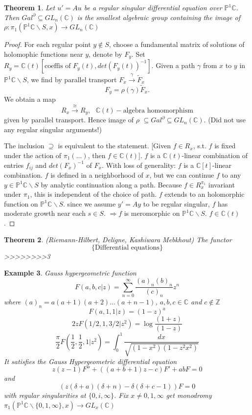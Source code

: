 \documentclass[11pt]{article}
\newtheorem{thm}{Theorem}[section]
\newtheorem{ex}[thm]{Example}
\newcommand{\pd}{\partial}
\newcommand{\cplx}{\mathbb C}
\newcommand{\intg}{\mathbb Z}
\newcommand{\Lrta}{\Longrightarrow}
\newcommand{\lrta}{\longrightarrow}
\begin{document}
\begin{thm}
Let $u'=A u$ be a regular singular differential equation over $\mathbb{P}^1\cplx$. Then $Gal^\pd\subseteq GL_n(\cplx)$ is the smallest algebraic group containing the image of $\rho: \pi_1(\mathbb{P}^1\cplx\backslash S,x)\lrta GL_n(\cplx)$
\end{thm}
\begin{proof}
For each regular point $y\notin S$, choose a fundamental matrix of solutions of holomophic functions near $y$, denote by $F_y$. Set $R_y=\cplx(t)[\text{coeffis of $F_y(t)$}, det(F_y(t))^{-1}]$. Given a path $\gamma$ from $x$ to $y$ in $\mathbb{P}^1\cplx\backslash S$, we find by parallel transport $F_x\overset{\gamma}{\lrta}\tilde{F}_x$
$$
F_y=\rho(\gamma) \tilde{F}_x.
$$
We obtain a map 
$$
R_x\overset{\cong}{\lrta}R_y, \ \ \ \cplx(t)-\text{algebra homomorphism}
$$
given by parallel transport. Hence image of $\rho$ $\subseteq Gal^\pd\subseteq GL_n(\cplx)$. (Did not use any regular singular arguments!)

The inclusion $\supseteq$ is equivalent  to the statement.
[Given $f\in R_x$, s.t. $f$ is fixed under the action of $\pi_1(...)$, then $f\in \cplx(t)$]. $f$ is a $\cplx(t)$-linear combination of entries $f_{ij} $ and $det(F_x)^{-1}$ of $F_x$. With loss of generality: $f$ is a $\cplx[t]$-linear combination. $f$ is defined in a neighborhood of $x$, but we can continue $f$ to any $y\in \mathbb{P}^1\cplx\backslash S$ by analytic continuation along a path. Because $f\in R_x^{\pi_1}$ invariant under $\pi_1$, this is independent of the choice of path. $f$ extends to an holomorphic function on $\mathbb{P}^1\cplx\backslash S$. since we assume $y'=Ay$ to be regular singular, $f$ has moderate growth near each $s\in S$.
$\Lrta f$ is meromorphic on $\mathbb{P}^1\cplx\backslash S$. $f\in \cplx(t)$.
\end{proof}

\begin{thm}
(Riemann-Hilbert, Deligne, Kashiwara Mebkhout)
The functor
$$
\{\text{Differential equations}\}
$$
>>>>>>>>3
\end{thm}


\begin{ex}
Gauss hypergeometric function
$$
F(a,b,c|z)=\sum^\infty_{n=0}\frac{(a)_n (b)_n}{(c)_n}z^n
$$
where $(a)_n=a(a+1)(a+2)...(a+n-1)$, $a,b,c\in\cplx$ and $c\notin \intg$
$$
F(a,1,1|z)=(1-z)^a
$$
$$
2z F(1/2,1,3/2|z^2)=\log\frac{(1+z)}{(1-z)}
$$
$$
\frac{\pi}{2}F(\frac{1}{2},\frac{1}{2},1|z^2)=\int^1_0\frac{dx}{\sqrt{(1-x^2)(1-z^2x^2)}}
$$
It satisfies the Gauss Hypergeometric differential equation
$$
z(z-1)F''+((a+b+1)z-c)F'+ab F=0
$$
and
$$
\left(z(\delta+a)(\delta+n)-\delta(\delta+c-1)\right)F=0
$$
with regular singularities at $\{0,i,\infty\}$. Fix $x\neq 0,1,\infty$ get monodromy $\pi_1(\mathbb{P}^1\cplx\backslash\{0,1,\infty\},x)\lrta GL_x(\cplx)$

\end{ex}
\end{document}
